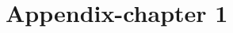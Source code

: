 \appendix           %
\appendixpage  		%
\addappheadtotoc 	%

\chapter{Appendix-chapter 1}
\label{chap:appendix-c1}